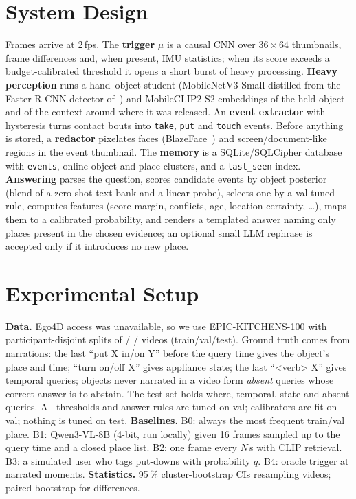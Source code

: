 \documentclass[10pt,twocolumn]{article}
\begin{document}
\section{System Design}
Frames arrive at 2\,fps. The \textbf{trigger} $\mu$ is a causal CNN over $36{\times}64$ thumbnails, frame differences and,
when present, IMU statistics; when its score exceeds a budget-calibrated threshold it opens a short burst of heavy
processing. \textbf{Heavy perception} runs a hand--object student (MobileNetV3-Small distilled from the Faster R-CNN
detector of~\citep{shan2020understanding}) and MobileCLIP2-S2 embeddings of the held object and of the context around
where it was released. An \textbf{event extractor} with hysteresis turns contact bouts into \texttt{take}, \texttt{put}
and \texttt{touch} events. Before anything is stored, a \textbf{redactor} pixelates faces (BlazeFace~\citep{bazarevsky2019blazeface})
and screen/document-like regions in the event thumbnail. The \textbf{memory} is a SQLite/SQLCipher database with
\texttt{events}, online object and place clusters, and a \texttt{last\_seen} index. \textbf{Answering} parses the question,
scores candidate events by object posterior (blend of a zero-shot text bank and a linear probe), selects one by a
val-tuned rule, computes features (score margin, conflicts, age, location certainty, \ldots), maps them to a calibrated
probability, and renders a templated answer naming only places present in the chosen evidence; an optional small LLM
rephrase is accepted only if it introduces no new place.

\section{Experimental Setup}
\textbf{Data.} Ego4D access was unavailable, so we use EPIC-KITCHENS-100 with participant-disjoint splits of
\NTrainVideos{} / \NValVideos{} / \NTestVideos{} videos (train/val/test). Ground truth comes from narrations: the last
``put X in/on Y'' before the query time gives the object's place and time; ``turn on/off X'' gives appliance state;
the last ``<verb> X'' gives temporal queries; objects never narrated in a video form \emph{absent} queries whose correct
answer is to abstain. The test set holds \NWhere{} where, \NTemporal{} temporal, \NState{} state and \NAbsent{} absent
queries. All thresholds and answer rules are tuned on val; calibrators are fit on val; nothing is tuned on test.
\textbf{Baselines.} B0: always the most frequent train/val place. B1: Qwen3-VL-8B (4-bit, run locally) given 16 frames
sampled up to the query time and a closed place list. B2: one frame every $N$\,s with CLIP retrieval. B3: a simulated
user who tags put-downs with probability $q$. B4: oracle trigger at narrated moments.
\textbf{Statistics.} 95\,\% cluster-bootstrap CIs resampling videos; paired bootstrap for differences.
\end{document}
